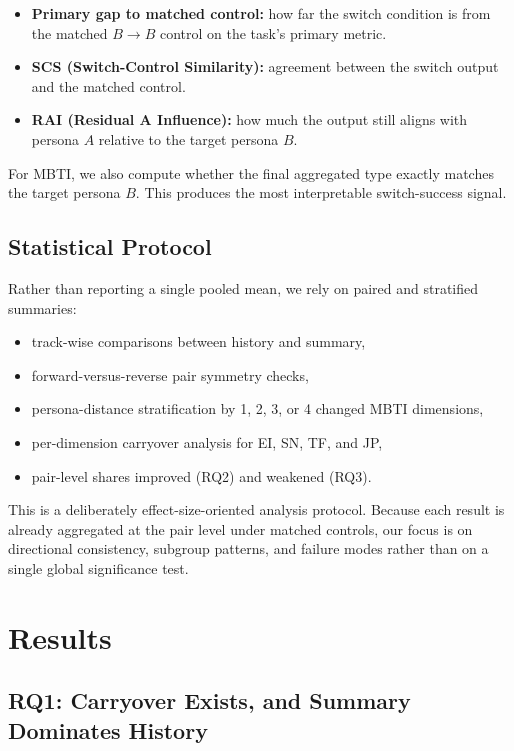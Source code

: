 \documentclass[11pt]{article}
\begin{document}
\begin{itemize}[leftmargin=*]
    \item \textbf{Primary gap to matched control:} how far the switch condition is from the matched $B \rightarrow B$ control on the task's primary metric.
    \item \textbf{SCS (Switch-Control Similarity):} agreement between the switch output and the matched control.
    \item \textbf{RAI (Residual A Influence):} how much the output still aligns with persona $A$ relative to the target persona $B$.
\end{itemize}

For MBTI, we also compute whether the final aggregated type exactly matches the target persona $B$.
This produces the most interpretable switch-success signal.

\subsection{Statistical Protocol}

Rather than reporting a single pooled mean, we rely on paired and stratified summaries:
\begin{itemize}[leftmargin=*]
    \item track-wise comparisons between history and summary,
    \item forward-versus-reverse pair symmetry checks,
    \item persona-distance stratification by 1, 2, 3, or 4 changed MBTI dimensions,
    \item per-dimension carryover analysis for EI, SN, TF, and JP,
    \item pair-level shares improved (RQ2) and weakened (RQ3).
\end{itemize}

This is a deliberately effect-size-oriented analysis protocol.
Because each result is already aggregated at the pair level under matched controls, our focus is on directional consistency, subgroup patterns, and failure modes rather than on a single global significance test.

\section{Results}

\subsection{RQ1: Carryover Exists, and Summary Dominates History}
\end{document}
